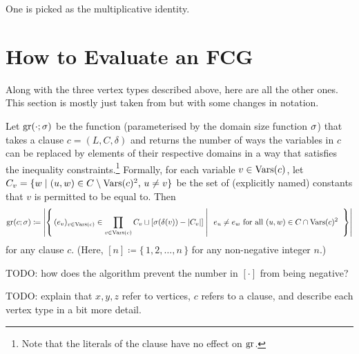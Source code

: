 One is picked as the multiplicative identity.

\section{How to Evaluate an FCG} \label{sec:evaluation}

Along with the three vertex types described above, here are all the other ones. This section is mostly just taken from \cite{DBLP:conf/ijcai/BroeckTMDR11} but with some changes in notation.

\begin{definition}
  Let $\operatorname{gr}(\cdot; \sigma)$ be the function (parameterised by the domain size function $\operatorname{\sigma}$) that takes a clause $c = (L, C, \delta)$ and returns the number of ways the variables in $c$ can be replaced by elements of their respective domains in a way that satisfies the inequality constraints.\footnote{Note that the literals of the clause have no effect on $\operatorname{gr}$.} Formally, for each variable $v \in \operatorname{Vars}(c)$, let $C_v = \{ w \mid (u, w) \in C \setminus \operatorname{Vars}(c)^2 \text{, }u \ne v \}$ be the set of (explicitly named) constants that $v$ is permitted to be equal to. Then
  \[
  \gr(c; \sigma) \coloneqq \left|\left\{\, (e_v)_{v \in \Vars(c)} \in \prod_{v \in \Vars(c)} C_v \sqcup [\sigma(\delta(v)) - |C_v|] \;\middle|\; \right.\right. e_u \ne e_w \text{ for all } (u, w) \in C \cap \Vars(c)^2 \left.\left. \vphantom{\prod_{v \in \Vars(c)}} \,\right\}\right|
  \]
  for any clause $c$. (Here, $[n] \coloneqq \{\,1, 2, \dots, n\,\}$ for any non-negative integer $n$.)
\end{definition}

TODO: how does the algorithm prevent the number in $[\cdot]$ from being negative?

TODO: explain that $x, y, z$ refer to vertices, $c$ refers to a clause, and describe each vertex type in a bit more detail.

